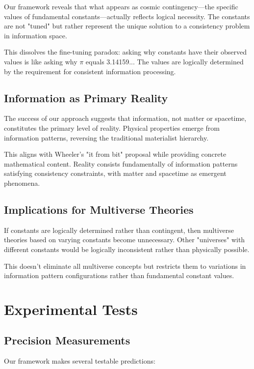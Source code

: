 \documentclass[12pt,a4paper]{article}
\begin{document}
Our framework reveals that what appears as cosmic contingency—the specific values of fundamental constants—actually reflects logical necessity. The constants are not "tuned" but rather represent the unique solution to a consistency problem in information space.

This dissolves the fine-tuning paradox: asking why constants have their observed values is like asking why $\pi$ equals 3.14159... The values are logically determined by the requirement for consistent information processing.

\subsection{Information as Primary Reality}

The success of our approach suggests that information, not matter or spacetime, constitutes the primary level of reality. Physical properties emerge from information patterns, reversing the traditional materialist hierarchy.

This aligns with Wheeler's "it from bit" proposal while providing concrete mathematical content. Reality consists fundamentally of information patterns satisfying consistency constraints, with matter and spacetime as emergent phenomena.

\subsection{Implications for Multiverse Theories}

If constants are logically determined rather than contingent, then multiverse theories based on varying constants become unnecessary. Other "universes" with different constants would be logically inconsistent rather than physically possible.

This doesn't eliminate all multiverse concepts but restricts them to variations in information pattern configurations rather than fundamental constant values.

\section{Experimental Tests}

\subsection{Precision Measurements}

Our framework makes several testable predictions:
\end{document}
